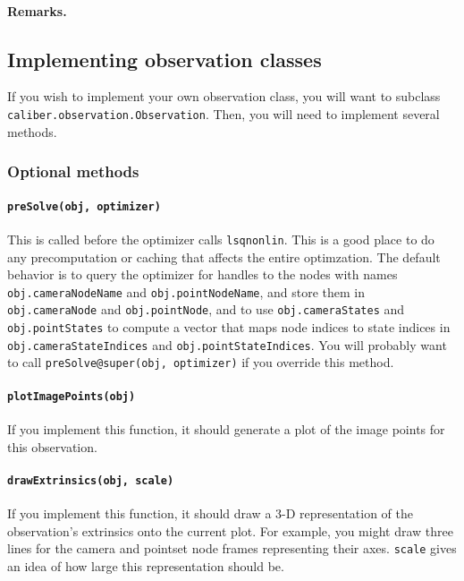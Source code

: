 \paragraph{Remarks.}

\subsection{Implementing observation classes}

If you wish to implement your own observation class, you will want to subclass \\
\texttt{caliber.observation.Observation}.
Then, you will need to implement several methods.

\subsubsection{Optional methods}

\paragraph{\texttt{preSolve(obj, optimizer)}}

This is called before the optimizer calls \texttt{lsqnonlin}. 
This is a good place to do any precomputation or caching that affects the entire optimzation.
The default behavior is to query the optimizer for handles to the nodes with names
\texttt{obj.cameraNodeName} and \texttt{obj.pointNodeName},
and store them in \texttt{obj.cameraNode} and \texttt{obj.pointNode},
and to use \texttt{obj.cameraStates} and \texttt{obj.pointStates} to compute a vector 
that maps node indices to state indices in \texttt{obj.cameraStateIndices}
and \texttt{obj.pointStateIndices}. 
You will probably want to call \texttt{preSolve@super(obj, optimizer)}
if you override this method.

\paragraph{\texttt{plotImagePoints(obj)}}

If you implement this function, it should generate a plot of the image points for this observation.

\paragraph{\texttt{drawExtrinsics(obj, scale)}}

If you implement this function, it should draw a 3-D representation of the observation's extrinsics onto the current plot.
For example, you might draw three lines for the camera and pointset node frames representing their axes.
\texttt{scale} gives an idea of how large this representation should be.

